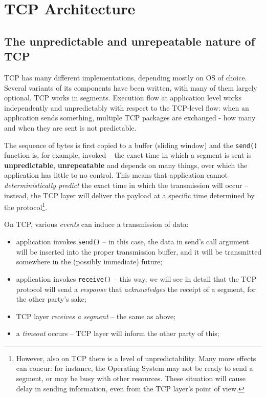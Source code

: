 \documentclass[10pt]{book}
\begin{document}
\section{TCP Architecture}

\subsection{The unpredictable and unrepeatable nature of TCP}

TCP has many different implementations, depending mostly on OS of choice.
Several variants of its components have been written, with many of them largely
optional. TCP works in segments. Execution flow at application level works
independently and unpredictably with respect to the TCP-level flow: when an
application sends something, multiple TCP packages are exchanged \-- how many
and when they are sent is not predictable. 

The sequence of bytes is first copied to a buffer (sliding window) and the
\texttt{send()} function is, for example, invoked \--- the exact time in which a
segment is sent is \textbf{unpredictable}, \textbf{unrepeatable} and depends on
many things, over which the application has little to no control. This means
that application cannot \emph{deterministically predict} the exact time in
which the transmission will occur \--- instead, the TCP layer will deliver the
payload at a specific time determined by the protocol\footnote{However, also on
TCP there is a level of unpredictability. Many more effects can concur: for
instance, the Operating System may not be ready to send a segment, or may be
busy with other resources. These situation will cause delay in sending
information, even from the TCP layer's point of view.}.

On TCP, various \emph{events} can induce a transmission of data:

\begin{itemize}
    \item application invokes \texttt{send()} \--- in this case, the data in
        send's call argument will be inserted into the proper transmission
        buffer, and it will be transmitted somewhere in the (possibly
        immediate) future; 
    \item application invokes \texttt{receive()} \--- this way, we will see in
        detail that the TCP protocol will send a \emph{response} that
        \emph{acknowledges} the receipt of a segment, for the other party's
        sake;
	\item TCP layer \emph{receives a segment} \--- the same as above;
    \item a \emph{timeout} occurs \--- TCP layer will inform the other party of
        this;
\end{itemize}
\end{document}
